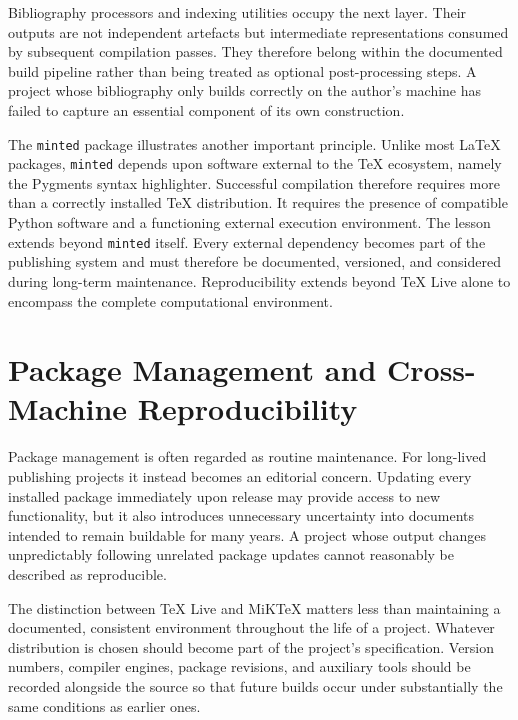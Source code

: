Bibliography processors and indexing utilities occupy the next layer. Their outputs are not independent artefacts but intermediate representations consumed by subsequent compilation passes. They therefore belong within the documented build pipeline rather than being treated as optional post-processing steps. A project whose bibliography only builds correctly on the author's machine has failed to capture an essential component of its own construction.

The \texttt{minted} package illustrates another important principle. Unlike most LaTeX packages, \texttt{minted} depends upon software external to the TeX ecosystem, namely the Pygments syntax highlighter. Successful compilation therefore requires more than a correctly installed TeX distribution. It requires the presence of compatible Python software and a functioning external execution environment. The lesson extends beyond \texttt{minted} itself. Every external dependency becomes part of the publishing system and must therefore be documented, versioned, and considered during long-term maintenance. Reproducibility extends beyond TeX Live alone to encompass the complete computational environment.

\hypertarget{package-management-and-cross-machine-reproducibility}{%
\section{Package Management and Cross-Machine Reproducibility}\label{package-management-and-cross-machine-reproducibility}}

Package management is often regarded as routine maintenance. For long-lived publishing projects it instead becomes an editorial concern. Updating every installed package immediately upon release may provide access to new functionality, but it also introduces unnecessary uncertainty into documents intended to remain buildable for many years. A project whose output changes unpredictably following unrelated package updates cannot reasonably be described as reproducible.

The distinction between TeX Live and MiKTeX matters less than maintaining a documented, consistent environment throughout the life of a project. Whatever distribution is chosen should become part of the project's specification. Version numbers, compiler engines, package revisions, and auxiliary tools should be recorded alongside the source so that future builds occur under substantially the same conditions as earlier ones.

